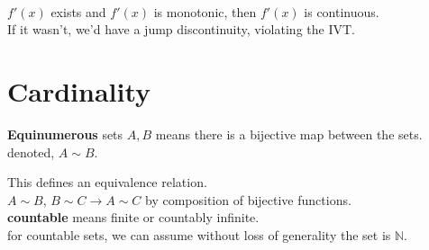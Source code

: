 \documentclass[12pt]{article}
\begin{document}
\centerline{}
\ \\
$f'(x)$ exists and $f'(x)$ is monotonic, then $f'(x)$ is continuous.\\
\textcolor[gray]{0.5}{If it wasn't, we'd have a jump discontinuity, violating the IVT.}

\section{Cardinality}

\textbf{Equinumerous} sets $A, B$ means there is a bijective map between the sets.\\
denoted, $A \sim B$.

This defines an equivalence relation. \\

$A \sim B$, $B \sim C \rightarrow A \sim C$ by composition of bijective functions.\\

\textbf{countable} means finite or countably infinite.\\

\noindent *for countable sets, we can assume without loss of generality the set is $\mathbb{N}$.
\end{document}
